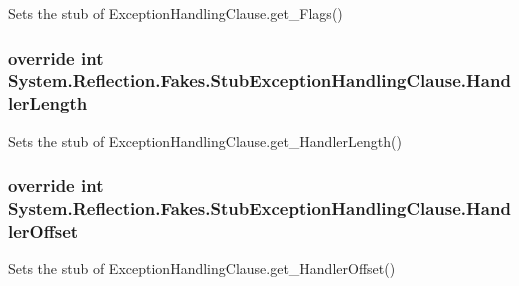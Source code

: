 Sets the stub of Exception\-Handling\-Clause.\-get\-\_\-\-Flags()

\hypertarget{class_system_1_1_reflection_1_1_fakes_1_1_stub_exception_handling_clause_a31b4a17d17adeed79b2cbe37eebd0ff7}{
\subsubsection[{Handler\-Length}]{\setlength{\rightskip}{0pt plus 5cm}override int System.\-Reflection.\-Fakes.\-Stub\-Exception\-Handling\-Clause.\-Handler\-Length\hspace{0.3cm}{\ttfamily [get]}}}\label{class_system_1_1_reflection_1_1_fakes_1_1_stub_exception_handling_clause_a31b4a17d17adeed79b2cbe37eebd0ff7}


Sets the stub of Exception\-Handling\-Clause.\-get\-\_\-\-Handler\-Length()

\hypertarget{class_system_1_1_reflection_1_1_fakes_1_1_stub_exception_handling_clause_af840af00c63b73f6ae8cb8933c150436}{
\subsubsection[{Handler\-Offset}]{\setlength{\rightskip}{0pt plus 5cm}override int System.\-Reflection.\-Fakes.\-Stub\-Exception\-Handling\-Clause.\-Handler\-Offset\hspace{0.3cm}{\ttfamily [get]}}}\label{class_system_1_1_reflection_1_1_fakes_1_1_stub_exception_handling_clause_af840af00c63b73f6ae8cb8933c150436}


Sets the stub of Exception\-Handling\-Clause.\-get\-\_\-\-Handler\-Offset()

